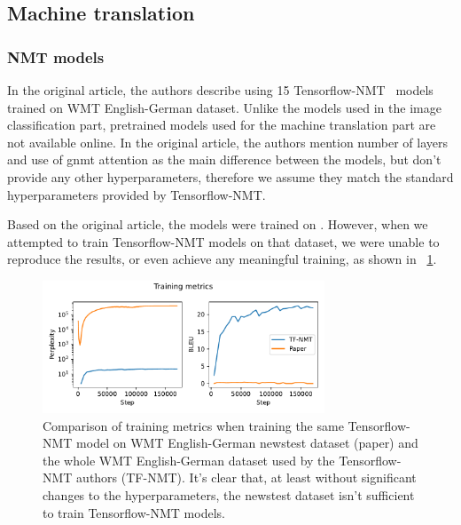 \begin{figure}
	
\end{figure}

\subsection{Machine translation}

\subsubsection{NMT models} %

In the original article, the authors describe using 15 Tensorflow-NMT~\cite{luong17} models trained on WMT English-German dataset. Unlike the models used in the image classification part, pretrained models used for the machine translation part are not available online. In the original article, the authors mention number of layers and use of gnmt attention as the main difference between the models, but don't provide any other hyperparameters, therefore we assume they match the standard hyperparameters provided by Tensorflow-NMT.

Based on the original article, the models were trained on . However, when we attempted to train Tensorflow-NMT models on that dataset, we were unable to reproduce the results, or even achieve any meaningful training, as shown in \figurename~\ref{fig:tf-nmt_paper_training}.

\begin{figure}[h]
	\centering
	\includegraphics[width=0.75\textwidth]{figures/tf-nmt_paper_training.pdf}
	\caption{Comparison of training metrics when training the same Tensorflow-NMT model on WMT English-German newstest dataset (paper) and the whole WMT English-German dataset used by the Tensorflow-NMT authors (TF-NMT). It's clear that, at least without significant changes to the hyperparameters, the newstest dataset isn't sufficient to train Tensorflow-NMT models.}
	\label{fig:tf-nmt_paper_training}
\end{figure}

